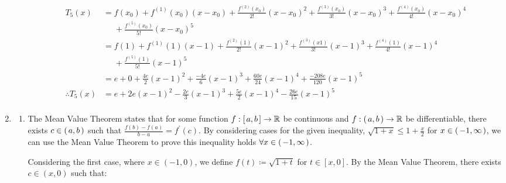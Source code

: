 \documentclass[a4paper]{article}
\begin{document}
\begin{enumerate}[label=\textbf{\arabic*.}]
\begin{enumerate}
		\begin{align*}
		T_5(x) & = f(x_0) + f^{(1)}(x_0)(x-x_0) + \frac{f^{(2)}(x_0)}{2!}(x-x_0)^2 + \frac{f^{(3)}(x_0)}{3!}(x-x_0)^3 + \frac{f^{(4)}(x_0)}{4!}(x-x_0)^4\\ 
		& \phantom{{=}} + \frac{f^{(5)}(x_0)}{5!}(x-x_0)^5\\
		& = f(1) + f^{(1)}(1)(x-1) + \frac{f^{(2)}(1)}{2!}(x-1)^2 + \frac{f^{(3)}(x1)}{3!}(x-1)^3 + \frac{f^{(4)}(1)}{4!}(x-1)^4\\ 
		& \phantom{{=}} + \frac{f^{(5)}(1)}{5!}(x-1)^5\\
		& = e + 0 + \frac{4e}{2}(x-1)^2 + \frac{-4e}{6}(x-1)^3 + \frac{60e}{24}(x-1)^4 + \frac{-208e}{120}(x-1)^5\\
		\therefore T_5(x) & = e + 2e(x-1)^2 - \frac{2e}{3}(x-1)^3 + \frac{5e}{2}(x-1)^4 - \frac{26e}{15}(x-1)^5\\
		\end{align*}


	\end{enumerate}

	\bigbreak

	\item

	\begin{enumerate}
		\item The Mean Value Theorem states that for some function $f:[\hspace{0.5mm} a,b \hspace{0.5mm}] \rightarrow \mathbb{R}$ be continuous and $f:(\hspace{0.5mm} a,b \hspace{0.5mm}) \rightarrow \mathbb{R}$ be differentiable, there exists $c \in (\hspace{0.5mm} a,b \hspace{0.5mm})$ such that $\displaystyle{\frac{f(b)-f(a)}{b-a} = f^\prime (c)}$. By considering cases for the given inequality, $\displaystyle{\sqrt{1+x} \leq 1 + \frac{x}{2}}$ for $x \in (\hspace{0.5mm} -1,\infty \hspace{0.5mm})$, we can use the Mean Value Theorem to prove this inequality holds $\forall x \in (\hspace{0.5mm} -1,\infty \hspace{0.5mm})$.

		\bigbreak

		Considering the first case, where $x \in (-1,0)$, we define $\displaystyle{f(t) \coloneqq \sqrt{1+t}}$ for $t\in[x,0]$. By the Mean Value Theorem, there exists $c\in(x,0)$ such that:


\end{enumerate}
\end{enumerate}
\end{document}
